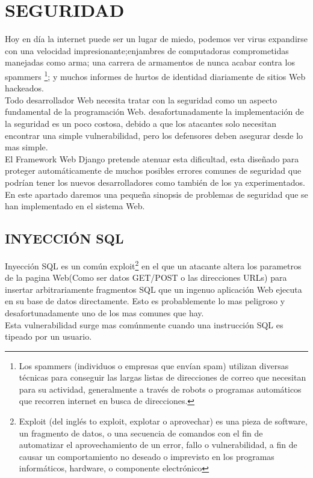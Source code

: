 \section{SEGURIDAD}

Hoy en día la internet puede ser un lugar de miedo, podemos ver virus expandirse con una velocidad impresionante;enjambres de computadoras comprometidas manejadas como arma; una carrera de armamentos de nunca acabar contra los spammers \footnote{Los spammers (individuos o empresas que envían spam) utilizan diversas técnicas para conseguir las largas listas de direcciones de correo que necesitan para su actividad, generalmente a través de robots o programas automáticos que recorren internet en busca de direcciones.}; y muchos informes de hurtos de identidad diariamente de sitios Web hackeados.\\
Todo desarrollador Web necesita tratar con la seguridad como un aspecto fundamental de la programación Web.
desafortunadamente la implementación de la seguridad es un poco costosa, debido a que los atacantes solo necesitan encontrar una simple vulnerabilidad, pero los defensores deben asegurar desde lo mas simple.\\
El Framework Web Django pretende atenuar esta dificultad, esta diseñado para proteger automáticamente de muchos posibles errores comunes de seguridad que podrían tener los nuevos desarrolladores como también de los ya experimentados.
En este apartado daremos una pequeña sinopsis de problemas de seguridad que se han implementado en el sistema Web.

\subsection{INYECCIÓN SQL}

Inyección SQL es un común exploit\footnote{Exploit (del inglés to exploit, explotar o aprovechar) es una pieza de software, un fragmento de datos, o una secuencia de comandos con el fin de automatizar el aprovechamiento de un error, fallo o vulnerabilidad, a fin de causar un comportamiento no deseado o imprevisto en los programas informáticos, hardware, o componente electrónico} en el que un atacante altera los parametros de la pagina Web(Como ser datos GET/POST o las direcciones URLs) para insertar arbitrariamente fragmentos SQL que un ingenuo aplicación Web ejecuta en su base de datos directamente. Esto es probablemente lo mas peligroso y desafortunadamente uno de los mas comunes que hay.\\
Esta vulnerabilidad surge mas comúnmente cuando una instrucción SQL es tipeado por un usuario.


